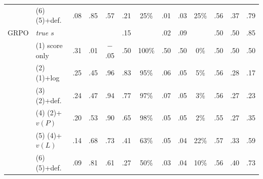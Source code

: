 \begin{tabular}{@{}llccccccccccc@{}}
 & (6) (5)+def. & .08 & .85 & .57 & .21 & 25\% & .01 & .03 & 25\% & .56 & .37 & .79 \\
\cmidrule(lr){1-13}
GRPO & \emph{true $s$} & & & & .15 & & .02 & .09 & & .50 & .50 & .85 \\
 & (1) score only & .31 & .01 & $-$.05 & .50 & 100\% & .50 & .50 & 0\% & .50 & .50 & .50 \\
 & (2) (1)+log & .25 & .45 & .96 & .83 & 95\% & .06 & .05 & 5\% & .56 & .28 & .17 \\
 & (3) (2)+def. & .24 & .47 & .94 & .77 & 97\% & .07 & .05 & 3\% & .56 & .27 & .23 \\
 & (4) (2)+$v(P)$ & .20 & .53 & .90 & .65 & 98\% & .05 & .05 & 2\% & .55 & .27 & .35 \\
 & (5) (4)+$v(L)$ & .14 & .68 & .73 & .41 & 63\% & .05 & .04 & 22\% & .57 & .33 & .59 \\
 & (6) (5)+def. & .09 & .81 & .61 & .27 & 50\% & .03 & .04 & 10\% & .56 & .40 & .73 \\
\bottomrule
\end{tabular}
